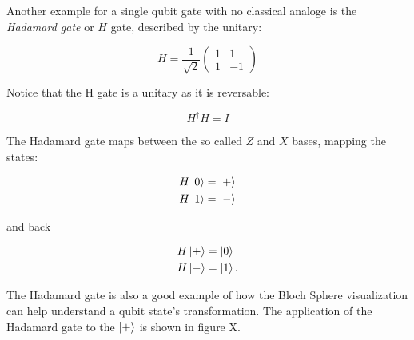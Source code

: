 Another example for a single qubit gate with no classical analoge is the
\textit{Hadamard gate} or $H$ gate, described by the unitary:

\begin{equation}
  H = \frac{1}{\sqrt{2}}
  \begin{pmatrix}
    1 & 1 \\
    1 & -1
  \end{pmatrix}
\end{equation}

Notice that the H gate is a unitary as it is reversable:

\begin{equation}
   H^{\dagger} H = I 
\end{equation}

The Hadamard gate maps between the so called $Z$ and $X$ bases, mapping the
states:

\begin{align}
  H \Ket{0} &= \Ket{+} \\
  H \Ket{1} &= \Ket{-}
\end{align}

and back

\begin{align}
  H \Ket{+} &= \Ket{0} \\
  H \Ket{-} &= \Ket{1}.
\end{align}

The Hadamard gate is also a good example of how the Bloch Sphere visualization can help understand a qubit state's transformation. The application of the Hadamard gate to the $\Ket{+}$ is shown in figure X.


